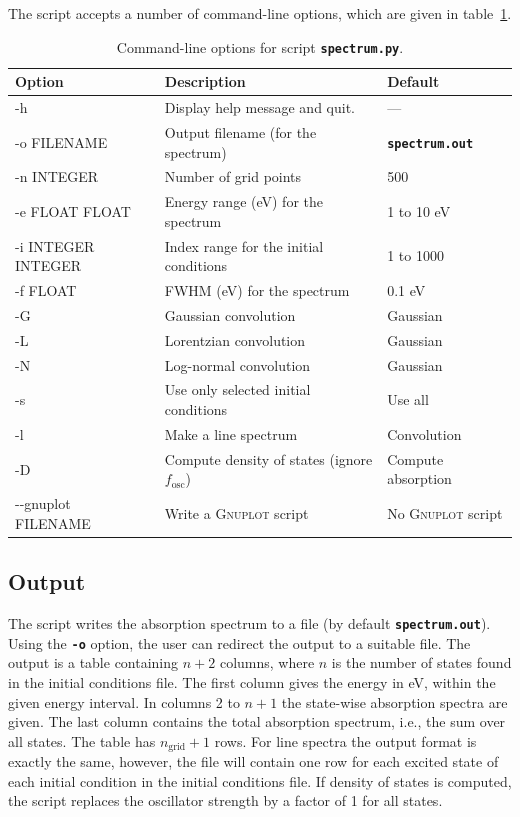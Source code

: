 \documentclass[a4paper,10pt,DIV=15,openany,twoside=false]{scrbook}
\newcommand{\ttt}[1]{\textbf{\texttt{#1}}}
\begin{document}
The script accepts a number of command-line options, which are given in table~\ref{tab:spectrum_opts}.
\begin{table}
  \centering
  \caption{Command-line options for script \ttt{spectrum.py}.}
  \label{tab:spectrum_opts}
  \begin{tabular}{>{\ttfamily}lll}
    \toprule
    \rmfamily Option        &Description      &Default\\
    \midrule
    -h                  &Display help message and quit.         &---       \\
    -o FILENAME         &Output filename (for the spectrum)     &\ttt{spectrum.out}\\
    -n INTEGER          &Number of grid points                  &500       \\
    -e FLOAT FLOAT      &Energy range (eV) for the spectrum     &1 to 10 eV\\
    -i INTEGER INTEGER  &Index range for the initial conditions &1 to 1000\\
    -f FLOAT            &FWHM (eV) for the spectrum             &0.1 eV\\
    -G                  &Gaussian convolution                   &Gaussian\\
    -L                  &Lorentzian convolution                 &Gaussian\\
    -N                  &Log-normal convolution                 &Gaussian\\
    -s                  &Use only selected initial conditions   &Use all\\
    -l                  &Make a line spectrum                   &Convolution\\
    -D                  &Compute density of states (ignore $f_\text{osc}$)      &Compute absorption\\
    -{}-gnuplot FILENAME  &Write a \textsc{Gnuplot} script        &No \textsc{Gnuplot} script\\
    \bottomrule
  \end{tabular}
\end{table}

\subsection{Output}

The script writes the absorption spectrum to a file (by default \ttt{spectrum.out}). Using the \ttt{-o} option, the user can redirect the output to a suitable file. The output is a table containing $n+2$ columns, where $n$ is the number of states found in the initial conditions file. The first column gives the energy in eV, within the given energy interval. In columns 2 to $n+1$ the state-wise absorption spectra are given. The last column contains the total absorption spectrum, i.e., the sum over all states. The table has $n_{\text{grid}}+1$ rows. For line spectra the output format is exactly the same, however, the file will contain one row for each excited state of each initial condition in the initial conditions file. If density of states is computed, the script replaces the oscillator strength by a factor of 1 for all states.
\end{document}

